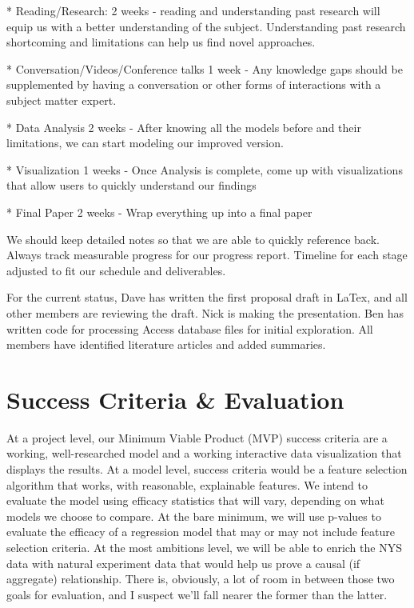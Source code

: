 \documentclass[sigconf,nonacm,11pt]{acmart}
\begin{document}
* Reading/Research:
2 weeks - reading and understanding past research will equip us with a better understanding of the subject. Understanding past research shortcoming and limitations can help us find novel approaches.

* Conversation/Videos/Conference talks
1 week - Any knowledge gaps should be supplemented by having a conversation or other forms of interactions  with a subject matter expert. 

* Data Analysis
2 weeks - After knowing all the models before and their limitations, we can start modeling our improved version.

* Visualization
1 weeks - Once Analysis is complete, come up with visualizations that allow users to quickly understand our findings

* Final Paper
2 weeks - Wrap everything up into a final paper

We should keep detailed notes so that we are able to quickly reference back. Always track measurable progress for our progress report. Timeline for each stage adjusted to fit our schedule and deliverables.

For the current status, Dave has written the first proposal draft in LaTex, and all other members are reviewing the draft. Nick is making the presentation. Ben has written code for processing Access database files for initial exploration. All members have identified literature articles and added summaries.


\section{Success Criteria \& Evaluation}
At a project level, our Minimum Viable Product (MVP) success criteria are a working, well-researched model and a working interactive data visualization that displays the results.  At a model level, success criteria would be a feature selection algorithm that works, with reasonable, explainable features.  We intend to evaluate the model using efficacy statistics that will vary, depending on what models we choose to compare.  At the bare minimum, we will use p-values to evaluate the efficacy of a regression model that may or may not include feature selection criteria.  At the most ambitions level, we will be able to enrich the NYS data with natural experiment data that would help us prove a causal (if aggregate) relationship.  There is, obviously, a lot of room in between those two goals for evaluation, and I suspect we'll fall nearer the former than the latter.  
\end{document}
